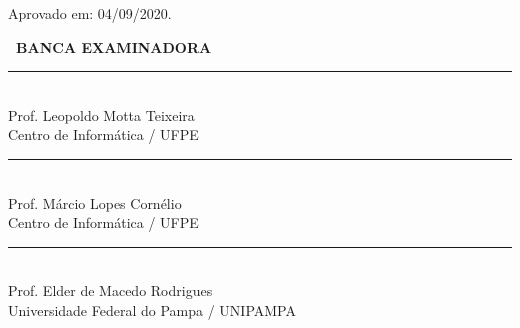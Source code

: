 
\thispagestyle{empty}
\begin{center}

    \textbf{{\ABNTEXchapterfont\fontsize{12}{12}\selectfont\imprimirautor}}
	
    \vspace{2cm}
    \begin{center}
      \ABNTEXchapterfont\fontsize{12}{12}\selectfont\imprimirtitulo
    \end{center}
    \vspace{0.5cm}
	

      \hspace{.20\textwidth}
      \begin{minipage}{.55\textwidth}
      	\SingleSpacing
         \imprimirpreambuloatadefesa
       \end{minipage}%
       
    \vspace{0.5cm}
    \begin{flushleft}
    {\fontsize{12}{12}\selectfont Aprovado em: 04/09/2020.}
    \vspace{0.5cm}
    \end{flushleft}

     \vspace{1cm}
     
    {\bfseries\fontsize{12}{12}\selectfont\ BANCA EXAMINADORA}
    
    \vspace{1cm}
    
        
		{\SingleSpacing
		\par\noindent\rule{0.6\textwidth}{0.4pt}\\
		Prof. Leopoldo Motta Teixeira\\
		Centro de Informática / UFPE}
        
        \vspace{0.2cm}
        {\SingleSpacing
		\par\noindent\rule{0.6\textwidth}{0.4pt}\\
		Prof. Márcio Lopes Cornélio\\
		Centro de Informática / UFPE}
		
        \vspace{0.2cm}
        {\SingleSpacing
		\par\noindent\rule{0.6\textwidth}{0.4pt}\\
		Prof. Elder de Macedo Rodrigues\\
		Universidade Federal do Pampa / UNIPAMPA}
		
	
  \end{center}
  
